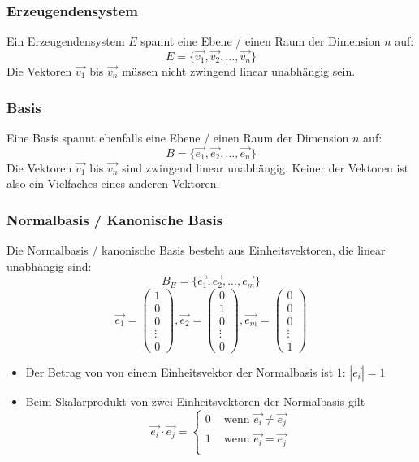 \subsubsection{Erzeugendensystem}
Ein Erzeugendensystem $E$ spannt eine Ebene / einen Raum der
Dimension $n$ auf:
\[ E = \{ \vec{v_1}, \vec{v_2}, ..., \vec{v_n}\} \]
Die Vektoren $\vec{v_1}$ bis $\vec{v_n}$ müssen nicht zwingend linear
unabhängig sein.

\subsubsection{Basis}
Eine Basis spannt ebenfalls eine Ebene / einen Raum der Dimension $n$
auf:
\[ B = \{ \vec{e_1}, \vec{e_2}, ..., \vec{e_n}\} \]
Die Vektoren $\vec{v_1}$ bis $\vec{v_n}$ sind zwingend linear
unabhängig. Keiner der Vektoren ist also ein Vielfaches eines anderen
Vektoren.

\subsubsection{Normalbasis / Kanonische Basis}
Die Normalbasis / kanonische Basis besteht aus Einheitsvektoren, die
linear unabhängig sind:
\[ B_E = \{ \vec{e_1}, \vec{e_2}, ..., \vec{e_m}\} \]
\[
  \vec{e_1} = \begin {pmatrix} 1 \\ 0 \\ 0 \\ \vdots \\ 0 \end {pmatrix}, 
  \vec{e_2} = \begin {pmatrix} 0 \\ 1 \\ 0 \\ \vdots \\ 0 \end {pmatrix}, 
  \vec{e_m} = \begin {pmatrix} 0 \\ 0 \\ 0 \\ \vdots \\ 1 \end {pmatrix}
\]
\begin{itemize}
  \item Der Betrag von von einem Einheitsvektor der Normalbasis ist $1$:
    $|\vec{e_i}| = 1$
  \item Beim Skalarprodukt von zwei Einheitsvektoren der Normalbasis
    gilt
    \[ \vec{e_i} \cdot \vec{e_j} = 
       \begin{cases}
         0 & \text{ wenn } \vec{e_i} \ne \vec{e_j} \\
         1 & \text{ wenn } \vec{e_i} = \vec{e_j} \\
       \end{cases}
    \]
\end{itemize}


